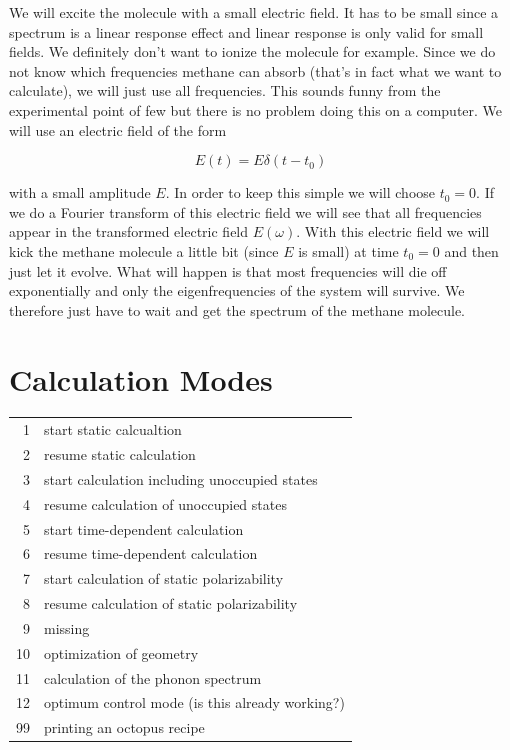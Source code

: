 \documentclass{article}
\begin{document}
We will excite the molecule with a small electric field. It has to be small
since a spectrum is a linear response effect and linear response is only valid
for small fields. We definitely don't want to ionize the molecule for example.
Since we do not know which frequencies methane can absorb (that's in fact what
we want to calculate), we will just use all frequencies. This sounds funny from
the experimental point of few but there is no problem doing this on a computer.
We will use an electric field of the form

\begin{equation}
E(t)=E\delta(t-t_0)
\end{equation}

with a small amplitude $E$. In order to keep this simple we will choose $t_0=0$.
If we do a Fourier transform of this electric field we will see that all
frequencies appear in the transformed electric field $E(\omega)$. With this
electric field we will kick the methane molecule a little bit (since $E$ is
small) at time $t_0=0$ and then just let it evolve. What will happen is that
most frequencies will die off exponentially and only the eigenfrequencies of the
system will survive. We therefore just have to wait and get the spectrum of the
methane molecule.


\appendix

\section{Calculation Modes}

\begin{tabular}{rl}
1 & start static calcualtion\\
2 & resume static calculation\\
3 & start calculation including unoccupied states\\
4 & resume calculation of unoccupied states\\
5 & start time-dependent calculation\\
6 & resume time-dependent calculation\\
7 & start calculation of static polarizability\\
8 & resume calculation of static polarizability\\
9 & missing\\
10 & optimization of geometry\\
11 & calculation of the phonon spectrum\\
12 & optimum control mode (is this already working?)\\
99 & printing an octopus recipe
\end{tabular}
\end{document}
